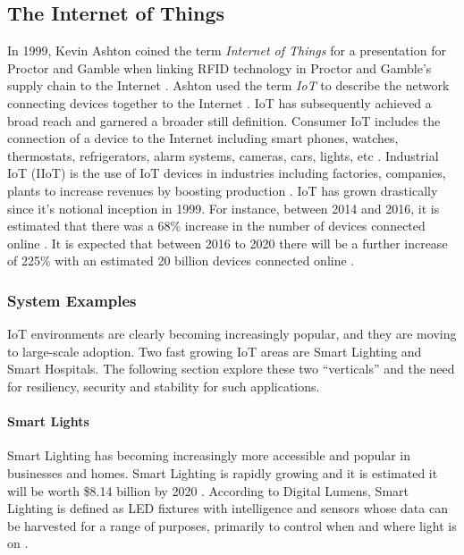 \documentclass[../main.tex]{subfiles}
\begin{document}
\subsection{The Internet of Things}
%
In 1999, Kevin Ashton coined the term {\em Internet of Things} for a presentation for Proctor and Gamble when linking RFID technology in Proctor and Gamble's supply chain to the Internet \cite{iot-rfid-journal,newsweek-iot}. Ashton used the term {\em IoT} to describe the network connecting devices together to the Internet \cite{smithsonian-iot}. IoT has subsequently achieved 
a broad reach and garnered a broader still definition. Consumer IoT includes the connection of a device to the Internet including smart phones, watches, thermostats, refrigerators, alarm systems, cameras, cars, lights, etc \cite{forbes-iot-exp,iot-analytics-def,7002114}. Industrial IoT (IIoT)  is the use of IoT devices in industries including factories, companies, plants to increase revenues by boosting production \cite{iiot-accent}. IoT has grown drastically since it's notional inception in 1999. For instance, between 2014 and 2016, it is estimated that there was a 68\% increase in the number of devices connected online \cite{gartner}. It is expected that between 2016 to 2020 there will be a further increase of 225\% with an estimated 20 billion devices connected online \cite{gartner}. 


\subsubsection{System Examples}

IoT environments are clearly becoming increasingly popular, and they are moving to large-scale adoption. Two fast growing IoT areas are Smart Lighting and Smart Hospitals. The following section explore these two ``verticals'' and the need for resiliency, security and stability for such applications.
%

\paragraph{Smart Lights}
%
Smart Lighting has becoming increasingly more accessible and popular in businesses and homes. Smart Lighting is rapidly growing and it is estimated it will be worth \$8.14 billion by 2020 \cite{smart_light}. According to Digital Lumens, Smart Lighting is defined as LED fixtures with intelligence and sensors whose data can be harvested for a range of purposes, primarily to control when and where light is on \cite{smart_light_2}. 
\end{document}
